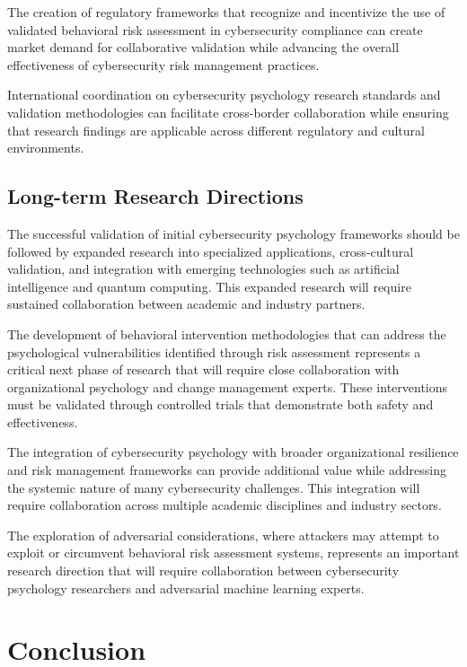 \documentclass[10pt,twocolumn]{IEEEtran}
\begin{document}
The creation of regulatory frameworks that recognize and incentivize the use of validated behavioral risk assessment in cybersecurity compliance can create market demand for collaborative validation while advancing the overall effectiveness of cybersecurity risk management practices.

International coordination on cybersecurity psychology research standards and validation methodologies can facilitate cross-border collaboration while ensuring that research findings are applicable across different regulatory and cultural environments.

\subsection{Long-term Research Directions}

The successful validation of initial cybersecurity psychology frameworks should be followed by expanded research into specialized applications, cross-cultural validation, and integration with emerging technologies such as artificial intelligence and quantum computing. This expanded research will require sustained collaboration between academic and industry partners.

The development of behavioral intervention methodologies that can address the psychological vulnerabilities identified through risk assessment represents a critical next phase of research that will require close collaboration with organizational psychology and change management experts. These interventions must be validated through controlled trials that demonstrate both safety and effectiveness.

The integration of cybersecurity psychology with broader organizational resilience and risk management frameworks can provide additional value while addressing the systemic nature of many cybersecurity challenges. This integration will require collaboration across multiple academic disciplines and industry sectors.

The exploration of adversarial considerations, where attackers may attempt to exploit or circumvent behavioral risk assessment systems, represents an important research direction that will require collaboration between cybersecurity psychology researchers and adversarial machine learning experts.

\section{Conclusion}
\end{document}
